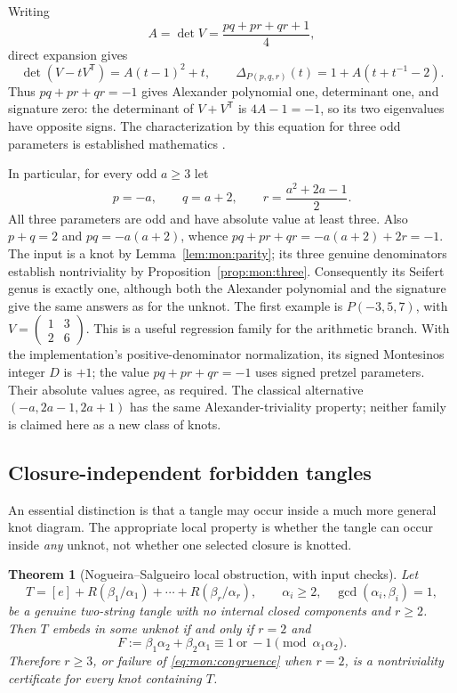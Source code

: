 \documentclass[11pt,a4paper]{article}
\newtheorem{theorem}{Theorem}[section]
\theoremstyle{definition}
\theoremstyle{remark}
\numberwithin{equation}{section}
\begin{document}
Writing
\[
 A=\det V=\frac{pq+pr+qr+1}{4},
\]
direct expansion gives
\[
 \det(V-tV^{\mathsf T})=A(t-1)^2+t,
 \qquad
 \Delta_{P(p,q,r)}(t)=1+A(t+t^{-1}-2).
\]
Thus $pq+pr+qr=-1$ gives Alexander polynomial one, determinant one, and
signature zero: the determinant of $V+V^{\mathsf T}$ is $4A-1=-1$, so its
two eigenvalues have opposite signs.  The characterization by this equation
for three odd parameters is established mathematics
\cite[Section~2.3]{belousov-pretzel}.

In particular, for every odd $a\ge3$ let
\begin{equation}\label{eq:mon:family}
 p=-a,\qquad q=a+2,\qquad r=\frac{a^2+2a-1}{2}.
\end{equation}
All three parameters are odd and have absolute value at least three.  Also
$p+q=2$ and $pq=-a(a+2)$, whence
$pq+pr+qr=-a(a+2)+2r=-1$.  The input is a knot by
Lemma~\ref{lem:mon:parity}; its three genuine denominators establish
nontriviality by Proposition~\ref{prop:mon:three}.  Consequently its Seifert
genus is exactly one, although both the Alexander polynomial and the
signature give the same answers as for the unknot.  The first example is
$P(-3,5,7)$, with
$V=\left(\begin{smallmatrix}1&3\\2&6\end{smallmatrix}\right)$.
This is a useful regression family for the arithmetic branch. With the
implementation's positive-denominator normalization, its signed
Montesinos integer $D$ is $+1$; the value $pq+pr+qr=-1$ uses signed
pretzel parameters. Their absolute values agree, as required.  The classical
alternative $(-a,2a-1,2a+1)$ has the same Alexander-triviality property;
neither family is claimed here as a new class of knots.

\subsection{Closure-independent forbidden tangles}

An essential distinction is that a tangle may occur inside a much more general
knot diagram.  The appropriate local property is whether the tangle can occur
inside \emph{any} unknot, not whether one selected closure is knotted.

\begin{theorem}[Nogueira--Salgueiro local obstruction, with input checks]
\label{thm:mon:local}
Let
\[
 T=[e]+R(\beta_1/\alpha_1)+\cdots+R(\beta_r/\alpha_r),
 \qquad \alpha_i\ge2,\quad\gcd(\alpha_i,\beta_i)=1,
\]
be a genuine two-string tangle with no internal closed components and
$r\ge2$.  Then $T$ embeds in some unknot if and only if $r=2$ and
\begin{equation}\label{eq:mon:congruence}
 F:=\beta_1\alpha_2+\beta_2\alpha_1
 \equiv1\ \text{or}\ -1\pmod{\alpha_1\alpha_2}.
\end{equation}
Therefore $r\ge3$, or failure of \eqref{eq:mon:congruence} when $r=2$,
is a nontriviality certificate for every knot containing $T$.
\end{theorem}
\end{document}
